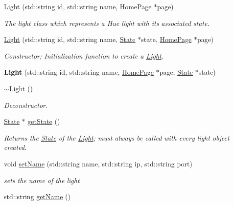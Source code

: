 \begin{DoxyCompactItemize}
\item 
\hyperlink{class_light_a51f6d94b66ec884ce479ae481de8247b}{Light} (std\+::string id, std\+::string name, \hyperlink{class_home_page}{Home\+Page} $\ast$page)
\begin{DoxyCompactList}\small\item\em The light class which represents a Hue light with it\textquotesingle{}s associated state. \end{DoxyCompactList}\item 
\hyperlink{class_light_a190b96270bfc664d1e209a5055330f40}{Light} (std\+::string id, std\+::string name, \hyperlink{class_state}{State} $\ast$state, \hyperlink{class_home_page}{Home\+Page} $\ast$page)
\begin{DoxyCompactList}\small\item\em Constructor; Initialization function to create a \hyperlink{class_light}{Light}. \end{DoxyCompactList}\item 
\mbox{\label{class_light_ace49d0a563a4e9711e03b144465e6e55}} 
{\bfseries Light} (std\+::string id, std\+::string name, \hyperlink{class_home_page}{Home\+Page} $\ast$page, \hyperlink{class_state}{State} $\ast$state)
\item 
\hyperlink{class_light_ad0e59fad13bb6cfadc25b2c477e9ddc7}{$\sim$\+Light} ()
\begin{DoxyCompactList}\small\item\em Deconstructor. \end{DoxyCompactList}\item 
\hyperlink{class_state}{State} $\ast$ \hyperlink{class_light_a287da1d58d038e10899c38f8464cbc22}{get\+State} ()
\begin{DoxyCompactList}\small\item\em Returns the \hyperlink{class_state}{State} of the \hyperlink{class_light}{Light}; must always be called with every light object created. \end{DoxyCompactList}\item 
void \hyperlink{class_light_aaa50f42697fdae36ec4b021098fac974}{set\+Name} (std\+::string name, std\+::string ip, std\+::string port)
\begin{DoxyCompactList}\small\item\em sets the name of the light \end{DoxyCompactList}\item 
std\+::string \hyperlink{class_light_a248c379885ea63ee7d71f7e19b0dab80}{get\+Name} ()

\end{DoxyCompactItemize}
